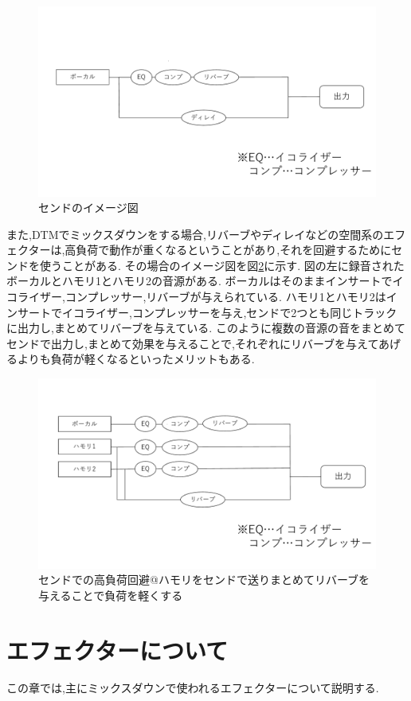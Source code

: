 \documentclass[12pt,a4j,titlepage]{ltjsarticle}
\begin{document}
\begin{figure}[H]
\centering
 \includegraphics[width=120mm]{./figures/send1.pdf}
 \caption{センドのイメージ図}
 \label{fig:send1}
\end{figure}

また,DTMでミックスダウンをする場合,リバーブやディレイなどの空間系のエフェクターは,高負荷で動作が重くなるということがあり,それを回避するためにセンドを使うことがある.
その場合のイメージ図を図\ref{fig:send2}に示す.
図の左に録音されたボーカルとハモリ1とハモリ2の音源がある.
ボーカルはそのままインサートでイコライザー,コンプレッサー,リバーブが与えられている.
ハモリ1とハモリ2はインサートでイコライザー,コンプレッサーを与え,センドで2つとも同じトラックに出力し,まとめてリバーブを与えている.
このように複数の音源の音をまとめてセンドで出力し,まとめて効果を与えることで,それぞれにリバーブを与えてあげるよりも負荷が軽くなるといったメリットもある.

\begin{figure}[H]
\centering
 \includegraphics[width=120mm]{./figures/send2.pdf}
 \caption{センドでの高負荷回避@ハモリをセンドで送りまとめてリバーブを与えることで負荷を軽くする}
 \label{fig:send2}
\end{figure}

\newpage
\section{エフェクターについて}
この章では,主にミックスダウンで使われるエフェクターについて説明する.
\end{document}
